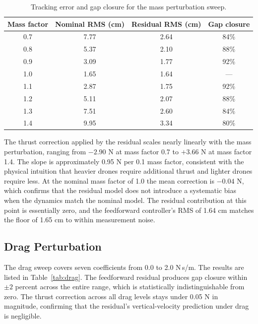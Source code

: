 \documentclass[conference]{IEEEtran}
\begin{document}
\begin{table}[t]
\centering
\caption{Tracking error and gap closure for the mass perturbation sweep.}
\label{tab:mass}
\begin{tabular}{cccc}
\toprule
Mass factor & Nominal RMS (cm) & Residual RMS (cm) & Gap closure \\
\midrule
0.7 & 7.77 & 2.64 & 84\% \\
0.8 & 5.37 & 2.10 & 88\% \\
0.9 & 3.09 & 1.77 & 92\% \\
1.0 & 1.65 & 1.64 & --- \\
1.1 & 2.87 & 1.75 & 92\% \\
1.2 & 5.11 & 2.07 & 88\% \\
1.3 & 7.51 & 2.60 & 84\% \\
1.4 & 9.95 & 3.34 & 80\% \\
\bottomrule
\end{tabular}
\end{table}

The thrust correction applied by the residual scales nearly linearly with the mass perturbation, ranging from $-2.90$ N at mass factor 0.7 to $+3.66$ N at mass factor 1.4. The slope is approximately 0.95 N per 0.1 mass factor, consistent with the physical intuition that heavier drones require additional thrust and lighter drones require less. At the nominal mass factor of 1.0 the mean correction is $-0.04$ N, which confirms that the residual model does not introduce a systematic bias when the dynamics match the nominal model. The residual contribution at this point is essentially zero, and the feedforward controller's RMS of 1.64 cm matches the floor of 1.65 cm to within measurement noise.

\subsection{Drag Perturbation}
The drag sweep covers seven coefficients from 0.0 to 2.0 N\,s/m. The results are listed in Table~\ref{tab:drag}. The feedforward residual produces gap closure within $\pm 2$ percent across the entire range, which is statistically indistinguishable from zero. The thrust correction across all drag levels stays under 0.05 N in magnitude, confirming that the residual's vertical-velocity prediction under drag is negligible.
\end{document}
